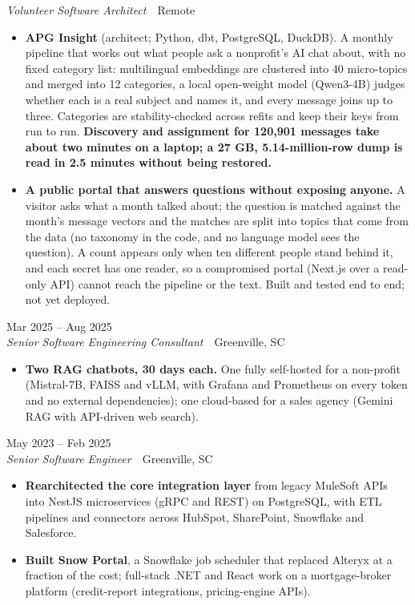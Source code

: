 \documentclass[10pt,letterpaper]{article}
\newcommand{\szmeta}{\fontsize{8pt}{10pt}\selectfont}
\begin{document}
{\itshape Volunteer Software Architect}{\color{muted}\ \textbullet\ Remote}
\vspace{2pt}
\begin{itemize}
\item \textbf{APG Insight} {\color{muted}(architect; Python, dbt, PostgreSQL, DuckDB)}. A monthly pipeline that works out what people ask a nonprofit's AI chat about, with no fixed category list: multilingual embeddings are clustered into 40 micro-topics and merged into 12 categories, a local open-weight model (Qwen3-4B) judges whether each is a real subject and names it, and every message joins up to three. Categories are stability-checked across refits and keep their keys from run to run. \textbf{Discovery and assignment for 120,901 messages take about two minutes on a laptop; a 27 GB, 5.14-million-row dump is read in 2.5 minutes without being restored.}
\item \textbf{A public portal that answers questions without exposing anyone.} A visitor asks what a month talked about; the question is matched against the month's message vectors and the matches are split into topics that come from the data (no taxonomy in the code, and no language model sees the question). A count appears only when ten different people stand behind it, and each secret has one reader, so a compromised portal (Next.js over a read-only API) cannot reach the pipeline or the text. Built and tested end to end; not yet deployed.
\end{itemize}
\vspace{3pt}
 \hfill {\color{muted}\szmeta Mar 2025 – Aug 2025}\\[1pt]
{\itshape Senior Software Engineering Consultant}{\color{muted}\ \textbullet\ Greenville, SC}
\vspace{2pt}
\begin{itemize}
\item \textbf{Two RAG chatbots, 30 days each.} One fully self-hosted for a non-profit (Mistral-7B, FAISS and vLLM, with Grafana and Prometheus on every token and no external dependencies); one cloud-based for a sales agency (Gemini RAG with API-driven web search).
\end{itemize}
\vspace{3pt}
 \hfill {\color{muted}\szmeta May 2023 – Feb 2025}\\[1pt]
{\itshape Senior Software Engineer}{\color{muted}\ \textbullet\ Greenville, SC}
\vspace{2pt}
\begin{itemize}
\item \textbf{Rearchitected the core integration layer} from legacy MuleSoft APIs into NestJS microservices (gRPC and REST) on PostgreSQL, with ETL pipelines and connectors across HubSpot, SharePoint, Snowflake and Salesforce.
\item \textbf{Built Snow Portal}, a Snowflake job scheduler that replaced Alteryx at a fraction of the cost; full-stack .NET and React work on a mortgage-broker platform (credit-report integrations, pricing-engine APIs).
\end{itemize}
\end{document}
